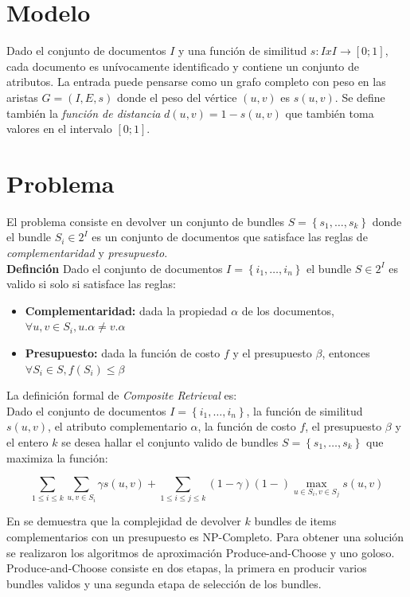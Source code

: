 \section{Modelo}
Dado el conjunto de documentos $I$ y una función de similitud $ s: I x I \rightarrow [0;1]$, cada documento es unívocamente identificado y contiene un conjunto de atributos. La entrada puede pensarse como un grafo completo con peso en las aristas $G=(I,E,s)$ donde el peso del vértice $(u,v)$ es $s(u,v)$. Se define también la \textit{función de distancia} $d(u,v) = 1 - s(u,v)$ que también toma valores en el intervalo $[0;1]$.

\section{Problema}
El problema consiste en devolver un conjunto de bundles $S = \left\{s_1, \ldots, s_k\right\}$ donde el bundle $S_i \in 2^{I}$ es un conjunto de documentos que satisface las reglas de \textit{complementaridad} y \textit{presupuesto}.\\
\textbf{Definción} Dado el conjunto de documentos $I=\left\{i_1,\ldots, i_n\right\}$ el bundle $S \in 2^{I}$ es valido si solo si satisface las reglas:
\begin{itemize}
	\item \textbf{Complementaridad:} dada la propiedad $\alpha$ de los documentos, $\forall u,v \in S_i, u.\alpha \neq v.\alpha$
	\item \textbf{Presupuesto:} dada la función de costo $f$ y el presupuesto $\beta$, entonces $\forall S_i \in S, f(S_i) \leq \beta$
\end{itemize}

La definición formal de \textit{Composite Retrieval} es:\\
Dado el conjunto de documentos $I = \left\{i_1, \ldots, i_n \right\}$, la función de similitud $s(u,v)$, el atributo complementario $\alpha$, la función de costo $f$, el presupuesto $\beta$ y el entero $k$ se desea hallar el conjunto valido de bundles $S = \left\{s_1, \ldots, s_k\right\}$ que maximiza la función:
	
	\begin{equation}
		\sum_{1 \leq i \leq k}{\sum_{u,v \in S_i}{\gamma s(u,v)}} + \sum_{1 \leq i \leq j \leq k}{(1-\gamma) (1-)\max_{u \in S_i, v \in S_j}{s(u,v)}}
	\end{equation}
	
En \cite{compositeRetrival} se demuestra que la complejidad de devolver $k$ bundles de items complementarios con un presupuesto es NP-Completo. Para obtener una solución se realizaron los algoritmos de aproximación Produce-and-Choose y uno goloso. Produce-and-Choose consiste en dos etapas, la primera en producir varios bundles validos y una segunda etapa de selección de los bundles.

